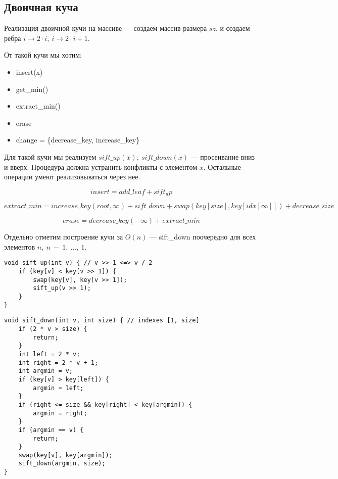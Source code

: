 \documentclass[12pt]{article}
\begin{document}
\subsection{Двоичная куча}

Реализация двоичной кучи на массиве --- создаем массив размера $sz$, и создаем ребра $i \rightarrow 2 \cdot i,\ i \rightarrow 2 \cdot i + 1$.

От такой кучи мы хотим:
\begin{itemize}
\item insert(x)
\item get\_min()
\item extract\_min()
\item erase
\item change = \{decrease\_key, increase\_key\}
\end{itemize}

Для такой кучи мы реализуем $sift\_up(x),\ sift\_down(x)$ --- просеивание вниз и вверх. Процедура должна устранить конфликты с элементом $x$. Остальные операции умеют реализовываться через нее. 

$$insert = add\_leaf + sift_up$$

$$extract\_min = increase\_key(root, \infty) + sift\_down + swap(key[size], key[idx[\infty]]) + decrease\_size$$

$$erase = decrease\_key(-\infty) + extract\_min$$

Отдельно отметим построение кучи за $O(n)$ --- sift\_down поочередно для всех элементов $n,~n~-~1,~\dots,~1$.

\begin{verbatim}
void sift_up(int v) { // v >> 1 <=> v / 2
    if (key[v] < key[v >> 1]) {
        swap(key[v], key[v >> 1]);
        sift_up(v >> 1);
    }
}
\end{verbatim} 

\begin{verbatim}
void sift_down(int v, int size) { // indexes [1, size]
    if (2 * v > size) {
        return;
    }
    int left = 2 * v;
    int right = 2 * v + 1;
    int argmin = v;
    if (key[v] > key[left]) {
        argmin = left;
    }
    if (right <= size && key[right] < key[argmin]) {
        argmin = right;
    }
    if (argmin == v) {
        return;
    }
    swap(key[v], key[argmin]);
    sift_down(argmin, size);
}
\end{verbatim}
\end{document}
